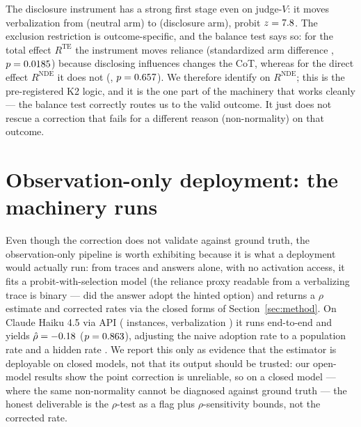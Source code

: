 \documentclass[10pt]{article}
\begin{document}
The disclosure instrument has a strong first stage even on judge-$V$: it moves
verbalization from \QQVzZero{} (neutral arm) to \QQVzOne{} (disclosure arm),
probit $z=7.8{}$. The exclusion restriction is outcome-specific, and the
balance test says so: for the total effect $R^{\mathrm{TE}}$ the instrument
moves reliance (standardized arm difference \QQBalRTESD{}, $p=0.0185{}$)
because disclosing influences changes the CoT, whereas for the direct effect
$R^{\mathrm{NDE}}$ it does not (\QQBalRNDESD{}, $p=0.657{}$). We therefore
identify on $R^{\mathrm{NDE}}$; this is the pre-registered K2 logic, and it is
the one part of the machinery that works cleanly --- the balance test correctly
routes us to the valid outcome. It just does not rescue a correction that fails
for a different reason (non-normality) on that outcome.

\begin{table}[t]
\centering
\caption{Left: the confound and correction on judge-$V$, identified direct
outcome $R^{\mathrm{NDE}}$; $\hat\mu_{\text{naive}}$ is the selected-sample
mean, $\hat\mu_{\text{corr}}$ the IMR-corrected estimate, $\mu_{\text{true}}$
the oracle mean over all instances; ``corr.\ wins'' = corrected closer to truth
than naive. Right: verbalization measurement --- lexical-detector rate vs.\
validated LLM-judge rate and the over-count factor. Qwen has too few
verbalizing traces (\QQwJudgeVerb) to fit.}
\label{tab:models}

\end{table}

\section{Observation-only deployment: the machinery runs}
\label{sec:e2}

Even though the correction does not validate against ground truth, the
observation-only pipeline is worth exhibiting because it is what a deployment
would actually run: from traces and answers alone, with no activation access,
it fits a probit-with-selection model (the reliance proxy readable from a
verbalizing trace is binary --- did the answer adopt the hinted option) and
returns a $\rho$ estimate and corrected rates via the closed forms of
Section~\ref{sec:method}. On Claude Haiku 4.5 via API (\QClHpN{} instances,
verbalization \QClHpV{}) it runs end-to-end and yields $\hat\rho=-0.18{}$
($p=0.863{}$), adjusting the naive adoption rate \QClHpNaive{} to a population
rate \QClHpCorrPop{} and a hidden rate \QClHpCorrHidden{}. We report this only
as evidence that the estimator is deployable on closed models, not that its
output should be trusted: our open-model results show the point correction is
unreliable, so on a closed model --- where the same non-normality cannot be
diagnosed against ground truth --- the honest deliverable is the $\rho$-test as
a flag plus $\rho$-sensitivity bounds, not the corrected rate.
\end{document}
